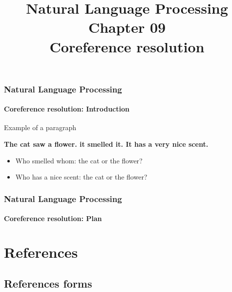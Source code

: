 \documentclass[xcolor=table]{beamer}
\title[ESI - NLP: 09- Coreference resolution]%
{Natural Language Processing\\Chapter 09\\Coreference resolution}
\begin{document}
	
\begin{frame}
\frametitle{Natural Language Processing}
\framesubtitle{Coreference resolution: Introduction}

\begin{exampleblock}{Example of a paragraph}
	\begin{center}
		\Large\bfseries
	The cat saw a flower. it smelled it. It has a very nice scent.
	\end{center}
\end{exampleblock}

\begin{itemize}
	\item Who smelled whom: the cat or the flower?
	\item Who has a nice scent: the cat or the flower?
\end{itemize}

\end{frame}

%
%

\begin{frame}
\frametitle{Natural Language Processing}
\framesubtitle{Coreference resolution: Plan}

\begin{multicols}{2}
\tableofcontents
\end{multicols}
\end{frame}

\section{References}

\subsection{References forms}
\end{document}
